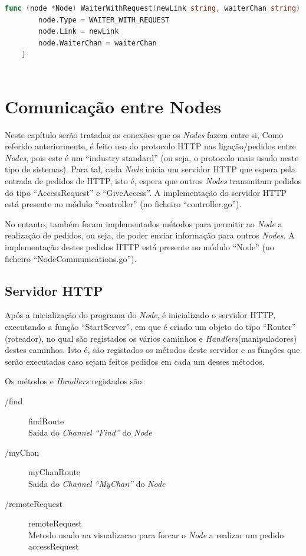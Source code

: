 \begin{lstlisting}[caption={Método/transformação ``WaiterWithRequest''},language=Go]
	func (node *Node) WaiterWithRequest(newLink string, waiterChan string) {
		node.Type = WAITER_WITH_REQUEST
		node.Link = newLink
		node.WaiterChan = waiterChan
	}
	
\end{lstlisting}

\section{Comunicação entre Nodes}

Neste capítulo serão tratadas as conexões que os \emph{Nodes} fazem entre si,
Como referido anteriormente, é feito uso do protocolo \acs{HTTP} nas ligação/pedidos entre \emph{Nodes}, pois este é um ``industry standard'' (ou seja, o protocolo mais usado neste tipo de sistemas).
Para tal, cada \emph{Node} inicia um servidor \acs{HTTP} que espera pela entrada de pedidos de HTTP, isto é, espera que outros \emph{Nodes} transmitam pedidos do tipo ``AccessRequest'' e ``GiveAccess''.
A implementação do servidor \acs{HTTP} está presente no módulo ``controller'' (no ficheiro ``controller.go'').

No entanto, também foram implementados métodos para permitir ao \emph{Node} a realização de pedidos, ou seja, de poder enviar informação para outros \emph{Nodes}.
A implementação destes pedidos \acs{HTTP} está presente no módulo ``Node'' (no ficheiro ``NodeCommunications.go'').



\subsection{Servidor \acs{HTTP}}
Após a inicialização do programa do \emph{Node}, é inicializado o servidor \acs{HTTP}, executando a função ``StartServer'', em que é criado um objeto do tipo ``Router'' (roteador),  
no qual são registados os vários caminhos e \emph{Handlers}(manipuladores) destes caminhos. Isto é, são registados os métodos deste servidor e as funções que serão executadas
caso sejam feitos pedidos em cada um desses métodos.

Os métodos e \emph{Handlers} registados são:


\begin{description}
	\item [/find] findRoute \\ Saida do \emph{Channel ``Find''} do \emph{Node}
	\item [/myChan] myChanRoute \\ Saida do \emph{Channel ``MyChan''} do \emph{Node}
	\item [/remoteRequest] remoteRequest \\ Metodo usado na visualizacao para forcar o \emph{Node} a realizar um pedido accessRequest
\end{description}

